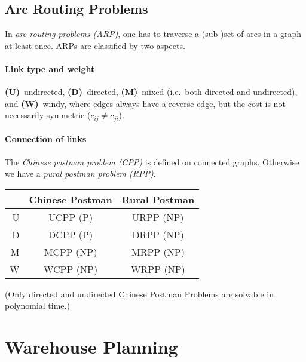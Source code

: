 \documentclass[english]{panikzettel}
\newcommand{\classP}{\textsf{P}}
\newcommand{\classNP}{\textsf{NP}}
\begin{document}
\subsection{Arc Routing Problems}
\label{sec:arp}

\begin{halfboxl}
    In \emph{arc routing problems (ARP)}, one has to traverse a (sub-)set of arcs in a graph at least once.
    ARPs are classified by two aspects.

    \vspace{-\baselineskip}
    \paragraph{Link type and weight} \textbf{(U)}~undirected, \textbf{(D)}~directed, \textbf{(M)}~mixed (i.e.\ both directed and undirected), and \textbf{(W)}~windy, where edges always have a reverse edge, but the cost is not necessarily symmetric ($c_{ij} \neq c_{ji}$).

    \vspace{-\baselineskip}
    \paragraph{Connection of links} The \emph{Chinese postman problem (CPP)} is defined on connected graphs.
    Otherwise we have a \emph{pural postman problem (RPP)}.
\end{halfboxl}%
\begin{halfboxr}
    \small{}
    \begin{center}
        \begin{tabular}{r|c|c|}
             & Chinese Postman & Rural Postman \\ \hline
            U & UCPP (\classP) & URPP (\classNP) \\ \hline
            D & DCPP (\classP) & DRPP (\classNP) \\ \hline
            M & MCPP (\classNP) & MRPP (\classNP) \\ \hline
            W & WCPP (\classNP) & WRPP (\classNP) \\ \hline
        \end{tabular}

        (Only directed and undirected Chinese Postman Problems are solvable in polynomial time.)
    \end{center}
\end{halfboxr}

\section{Warehouse Planning}
\end{document}
